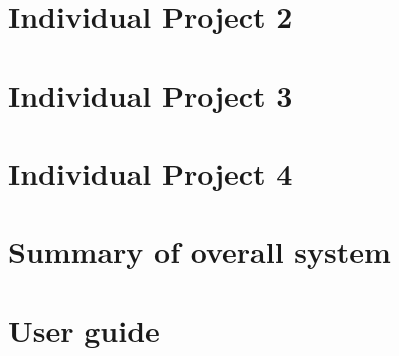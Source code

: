 \documentclass[11pt,a4paper]{report}
\begin{document}
\chapter{Individual Project 2}

\chapter{Individual Project 3}

\chapter{Individual Project 4}

\chapter{Summary of overall system}

\appendix

\chapter{User guide}

\printbibliography
\end{document}
